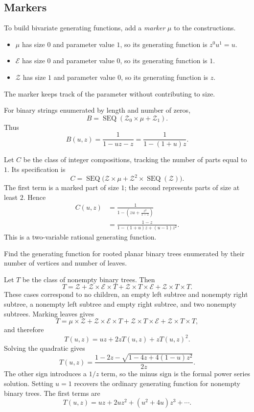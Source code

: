 \subsection{Markers}
To build bivariate generating functions, add a \textit{marker} $\mu$ to the constructions.
\begin{itemize}
\item $\mu$ has size $0$ and parameter value $1$, so its generating function is $z^0u^1=u$.
\item $\mathcal E$ has size $0$ and parameter value $0$, so its generating function is $1$.
\item $\mathcal Z$ has size $1$ and parameter value $0$, so its generating function is $z$.
\end{itemize}
The marker keeps track of the parameter without contributing to size.
\begin{example}
For binary strings enumerated by length and number of zeros,
\[
B=\operatorname{SEQ}(\mathcal Z_0\times\mu+\mathcal Z_1).
\]
Thus
\[
B(u,z)=\frac1{1-uz-z}=\frac1{1-(1+u)z}.
\]
\end{example}
\begin{example}
Let $C$ be the class of integer compositions, tracking the number of parts equal to $1$. Its specification is
\[
C=\operatorname{SEQ}\bigl(\mathcal Z\times\mu
  +\mathcal Z^2\times\operatorname{SEQ}(\mathcal Z)\bigr).
\]
The first term is a marked part of size $1$; the second represents parts of size at least $2$. Hence
\begin{align*}
C(u,z)&=\frac1{1-\left(zu+\frac{z^2}{1-z}\right)}\\
&=\frac{1-z}{1-(1+u)z+(u-1)z^2}.
\end{align*}
This is a two-variable rational generating function.
\end{example}
\begin{example}
Find the generating function for rooted planar binary trees enumerated by their number of vertices and number of leaves.\par\medskip
Let $T$ be the class of nonempty binary trees. Then
\[
T=\mathcal Z+\mathcal Z\times\mathcal E\times T
 +\mathcal Z\times T\times\mathcal E+\mathcal Z\times T\times T.
\]
These cases correspond to no children, an empty left subtree and nonempty right subtree, a nonempty left subtree and empty right subtree, and two nonempty subtrees.
Marking leaves gives
\[
T=\mu\times\mathcal Z+\mathcal Z\times\mathcal E\times T
 +\mathcal Z\times T\times\mathcal E+\mathcal Z\times T\times T,
\]
and therefore
\[
T(u,z)=uz+2zT(u,z)+zT(u,z)^2.
\]
Solving the quadratic gives
\[
T(u,z)=\frac{1-2z-\sqrt{1-4z+4(1-u)z^2}}{2z}.
\]
The other sign introduces a $1/z$ term, so the minus sign is the formal power series solution. Setting $u=1$ recovers the ordinary generating function for nonempty binary trees. The first terms are
\[
T(u,z)=uz+2uz^2+(u^2+4u)z^3+\cdots.
\]

\end{example}

